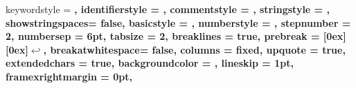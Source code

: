 \linespread{1.5}


%
%
%
% 
\usepackage{subfiles}


\usepackage{graphicx}
\usepackage{subcaption}
\usepackage{float}
\graphicspath{{../Figures/}}

\newcommand{\code}[1]{{\fontfamily{pcr}\selectfont #1}}



\usepackage{xspace}
\newcommand{\codeTitle}{Kodeudsnit\xspace}

\usepackage{listings}
\usepackage{color}
\usepackage{textcomp}
\renewcommand{\lstlistingname}{\codeTitle}
{
	keywordstyle	= \bfseries\ttfamily\color[rgb]{0,0,1},
	identifierstyle	= \ttfamily,
	commentstyle	= \color[rgb]{0.133,0.545,0.133},
	stringstyle		= \ttfamily\color[rgb]{0.627,0.126,0.941},
	showstringspaces= false,
	basicstyle		= \small,
	numberstyle		= \footnotesize,
	stepnumber		= 2,
	numbersep		= 6pt,
	tabsize			= 2,
	breaklines		= true,
	prebreak 		= \raisebox{0ex}[0ex][0ex]{\ensuremath{\hookleftarrow}},
	breakatwhitespace= false,
  	columns			= fixed,
  	upquote			= true,
  	extendedchars	= true,
 	backgroundcolor = \color{lbcolor},
	lineskip		= 1pt,
	framexrightmargin	= 0pt, %
}


